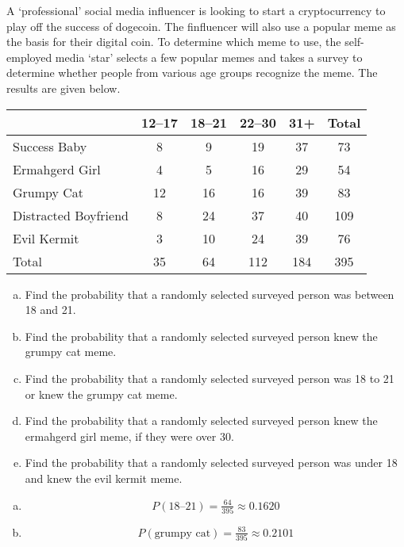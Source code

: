 \documentclass[12pt,letterpaper]{exam}
\begin{document}
\begin{questions}
\newpage
\question[15] A `professional' social media influencer is looking to start a cryptocurrency to play off the success of dogecoin. The finfluencer will also use a popular meme as the basis for their digital coin. To determine which meme to use, the self-employed media `star' selects a few popular memes and takes a survey to determine whether people from various age groups recognize the meme. The results are given below. 
	\begin{table}[h]
	\centering
	\begin{tabular}{|l||c|c|c|c||c|} \hline
	& 12--17 & 18--21 & 22--30 & 31+ & Total \\ \hline \hline
	Success Baby & 8 & 9 & 19 & 37 & 73 \\ \hline
	Ermahgerd Girl & 4 & 5 & 16 & 29 & 54 \\ \hline
	Grumpy Cat & 12 & 16 & 16 & 39 & 83 \\ \hline
	Distracted Boyfriend & 8 & 24 & 37 & 40 & 109 \\ \hline
	Evil Kermit & 3 & 10 & 24 & 39 & 76 \\ \hline \hline
	Total & 35 & 64 & 112 & 184 & 395 \\ \hline
	\end{tabular}
	\end{table}

\begin{enumerate}[(a)]
\item Find the probability that a randomly selected surveyed person was between 18 and 21. 
\item Find the probability that a randomly selected surveyed person knew the grumpy cat meme.
\item Find the probability that a randomly selected surveyed person was 18 to 21 or knew the grumpy cat meme. 
\item Find the probability that a randomly selected surveyed person knew the ermahgerd girl meme, if they were over 30.   
\item Find the probability that a randomly selected surveyed person was under 18 and knew the evil kermit meme. 
\end{enumerate} 

\sol 
\begin{enumerate}[(a)]
\item 
	\[
	P(\text{18--21})= \tfrac{64}{395} \approx 0.1620
	\] 

\item 
	\[
	P(\text{grumpy cat})= \tfrac{83}{395} \approx 0.2101
	\] 


\end{enumerate}
\end{questions}
\end{document}
